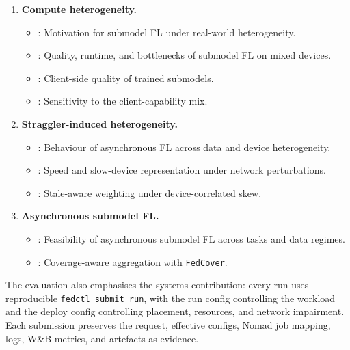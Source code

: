 \begin{enumerate}[leftmargin=*]
  \item \textbf{Compute heterogeneity.}
  \begin{itemize}[leftmargin=1.5em, nosep]
    \item {}: Motivation for submodel FL under real-world heterogeneity.
    \item {}: Quality, runtime, and bottlenecks of submodel FL on mixed devices.
    \item {}: Client-side quality of trained submodels.
    \item {}: Sensitivity to the client-capability mix.
  \end{itemize}
  \item \textbf{Straggler-induced heterogeneity.}
  \begin{itemize}[leftmargin=1.5em, nosep]
    \item {}: Behaviour of asynchronous FL across data and device heterogeneity.
    \item {}: Speed and slow-device representation under network perturbations.
    \item {}: Stale-aware weighting under device-correlated skew.
  \end{itemize}
  \item \textbf{Asynchronous submodel FL.}
  \begin{itemize}[leftmargin=1.5em, nosep]
    \item {}: Feasibility of asynchronous submodel FL across tasks and data regimes.
    \item {}: Coverage-aware aggregation with \texttt{FedCover}.
  \end{itemize}
\end{enumerate}

The evaluation also emphasises the systems contribution: every run uses reproducible \texttt{fedctl submit run}, with the run config controlling the workload and the deploy config controlling placement, resources, and network impairment. Each submission preserves the request, effective configs, Nomad job mapping, logs, W\&B metrics, and artefacts as evidence.


